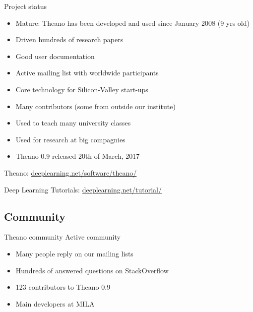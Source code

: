 \documentclass[utf8x,xcolor=pdftex,dvipsnames,table]{beamer}
\begin{document}
\begin{frame}{Project status}
  \begin{itemize}
    \item Mature: Theano has been developed and used since January 2008 (9 yrs old)
    \item Driven hundreds of research papers %
    \item Good user documentation
    \item Active mailing list with worldwide participants
    \item Core technology for Silicon-Valley start-ups
    \item Many contributors (some from outside our institute)
    \item Used to teach many university classes
    \item Used for research at big compagnies
    \item Theano 0.9 released 20th of March, 2017
  \end{itemize}
  Theano: \url{deeplearning.net/software/theano/}

  Deep Learning Tutorials: \url{deeplearning.net/tutorial/}
\end{frame}

\subsection{Community}
\begin{frame}{Theano community}
Active community
  \begin{itemize}
  \item Many people reply on our mailing lists
  \item Hundreds of answered questions on StackOverflow
  \item 123 contributors to Theano 0.9
  \item Main developers at MILA
  \end{itemize}
\end{frame}

\end{document}
